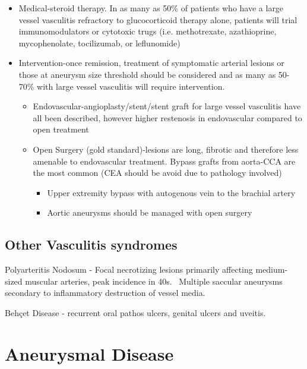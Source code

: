 \documentclass[
]{book}
\begin{document}
\begin{itemize}
\item
  Medical-steroid therapy. In as many as 50\% of patients who have a
  large vessel vasculitis refractory to glucocorticoid therapy alone,
  patients will trial immunomodulators or cytotoxic trugs (i.e.
  methotrexate, azathioprine, mycophenolate, tocilizumab, or
  leflunomide)
\item
  Intervention-once remission, treatment of symptomatic arterial
  lesions or those at aneurysm size threshold should be considered and
  as many as 50-70\% with large vessel vasculitis will require
  intervention.

  \begin{itemize}
  \item
    Endovascular-angioplasty/stent/stent graft for large vessel
    vasculitis have all been described, however higher restenosis in
    endovascular compared to open treatment
  \item
    Open Surgery (gold standard)-lesions are long, fibrotic and
    therefore less amenable to endovascular treatment. Bypass grafts
    from aorta-CCA are the most common (CEA should be avoid due to
    pathology involved)

    \begin{itemize}
    \item
      Upper extremity bypass with autogenous vein to the brachial
      artery
    \item
      Aortic aneurysms should be managed with open
      surgery\citep{janssen2008}
    \end{itemize}
  \end{itemize}
\end{itemize}

\hypertarget{other-vasculitis-syndromes}{%
\subsection{Other Vasculitis syndromes}\label{other-vasculitis-syndromes}}

Polyarteritis Nodosum - Focal necrotizing lesions primarily affecting
medium-sized muscular arteries, peak incidence in 40s.~ Multiple
saccular aneurysms secondary to inflammatory destruction of vessel
media.\citep{shanmugam2019, weyand2003}

Behçet Disease - recurrent oral pathos ulcers, genital ulcers and
uveitis.\citep{shanmugam2019, weyand2003}

\hypertarget{aneurysmal-disease}{%
\section{Aneurysmal Disease}\label{aneurysmal-disease}}
\end{document}
